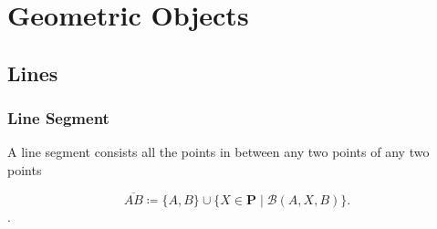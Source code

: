 \documentclass[../../../main/main.tex]{subfiles}
\begin{document}
\chapter{Geometric Objects}

\section{Lines}

\subsection{Line Segment}
A line segment consists all the points in between any two points of any two points 
\begin{definition}
    \[ \overline{AB} \coloneqq \{A, B\} \cup \{X \in \mathbf{P} \mid \mathcal{B}(A,X,B)\}. \].
\end{definition}
\end{document}
